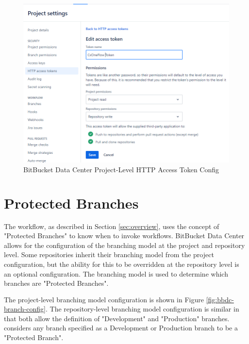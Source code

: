 \begin{figure}[h]
    \includegraphics[width=\textwidth]{graphics/bbdc-token-config.png}
    \caption{BitBucket Data Center Project-Level HTTP Access Token Config}
    \label{fig:bbdc-token-config}
\end{figure}


\section{Protected Branches}

The \cxoneflow workflow, as described in Section \ref{sec:overview}, uses the concept of "Protected Branches"
to know when to invoke workflows.  BitBucket Data Center allows for the configuration of the branching model
at the project and repository level.  Some repositories inherit their branching model from the project
configuration, but the ability for this to be overridden at the repository level is an optional configuration.
The branching model is used to determine which branches are "Protected Branches".

The project-level branching model configuration is shown in Figure \ref{fig:bbdc-branch-config}.  The
repository-level branching model configuration is similar in that both allow the definition of
"Development" and "Production" branches.  \cxoneflow considers any branch specified as a Development
or Production branch to be a "Protected Branch".

